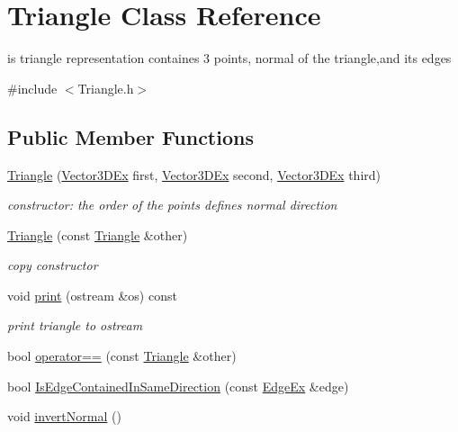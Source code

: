 \hypertarget{class_triangle}{
\section{\-Triangle \-Class \-Reference}
\label{class_triangle}
}


is triangle representation containes 3 points, normal of the triangle,and its edges  




{\ttfamily \#include $<$\-Triangle.\-h$>$}

\subsection*{\-Public \-Member \-Functions}
\begin{DoxyCompactItemize}
\item 
\hyperlink{class_triangle_a184780db9bb2d6a77e871506c7bd3022}{\-Triangle} (\hyperlink{class_vector3_d_ex}{\-Vector3\-D\-Ex} first, \hyperlink{class_vector3_d_ex}{\-Vector3\-D\-Ex} second, \hyperlink{class_vector3_d_ex}{\-Vector3\-D\-Ex} third)
\begin{DoxyCompactList}\small\item\em constructor\-: the order of the points defines normal direction \end{DoxyCompactList}\item 
\hypertarget{class_triangle_a2e9b9526d9797c9ae410f495e3043e97}{
\hyperlink{class_triangle_a2e9b9526d9797c9ae410f495e3043e97}{\-Triangle} (const \hyperlink{class_triangle}{\-Triangle} \&other)}
\label{class_triangle_a2e9b9526d9797c9ae410f495e3043e97}

\begin{DoxyCompactList}\small\item\em copy constructor \end{DoxyCompactList}\item 
\hypertarget{class_triangle_af35ae127d2db3a4be5d73591b7a1df14}{
void \hyperlink{class_triangle_af35ae127d2db3a4be5d73591b7a1df14}{print} (ostream \&os) const }
\label{class_triangle_af35ae127d2db3a4be5d73591b7a1df14}

\begin{DoxyCompactList}\small\item\em print triangle to ostream \end{DoxyCompactList}\item 
bool \hyperlink{class_triangle_aff0b2e1b32208111ff6d01a695bfbf36}{operator==} (const \hyperlink{class_triangle}{\-Triangle} \&other)
\item 
bool \hyperlink{class_triangle_a9b513460a157ac8a39b6fe026a5db3cf}{\-Is\-Edge\-Contained\-In\-Same\-Direction} (const \hyperlink{class_edge_ex}{\-Edge\-Ex} \&edge)
\item 
\hypertarget{class_triangle_ad294a636f3fe2c5a49822169783cbff5}{
void \hyperlink{class_triangle_ad294a636f3fe2c5a49822169783cbff5}{invert\-Normal} ()}
\label{class_triangle_ad294a636f3fe2c5a49822169783cbff5}


\end{DoxyCompactItemize}
